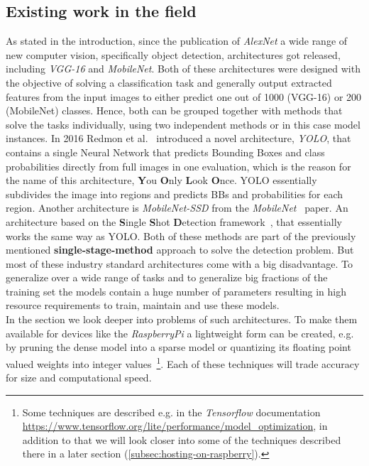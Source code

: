 \subsection{Existing work in the field}\label{subsec:existing-work-in-the-field}
As stated in the introduction, since the publication of \textit{AlexNet} a wide range of new computer vision, specifically object detection, architectures got released, including \textit{VGG-16} and \textit{MobileNet}.
Both of these architectures were designed with the objective of solving a classification task and generally output extracted features from the input images to either predict one out of 1000 (VGG-16) or 200 (MobileNet) classes.
Hence, both can be grouped together with methods that solve the tasks individually, using two independent methods or in this case model instances.
In 2016 Redmon et al.~\cite{yolo} introduced a novel architecture, \textit{YOLO}, that contains a single Neural Network that predicts Bounding Boxes and class probabilities directly from full images in one evaluation, which is the reason for the name of this architecture, \textbf{Y}ou \textbf{O}nly \textbf{L}ook \textbf{O}nce.
YOLO essentially subdivides the image into regions and predicts BBs and probabilities for each region.
Another architecture is \textit{MobileNet-SSD} from the \textit{MobileNet}~\cite{MobileNet} paper. An architecture based on the \textbf{S}ingle \textbf{S}hot \textbf{D}etection framework~\cite{SSD}, that essentially works the same way as YOLO.
Both of these methods are part of the previously mentioned \textbf{single-stage-method} approach to solve the detection problem.
But most of these industry standard architectures come with a big disadvantage.
To generalize over a wide range of tasks and to generalize big fractions of the training set the models contain a huge number of parameters resulting in high resource requirements to train, maintain and use these models.\\
In the  section we look deeper into problems of such architectures.
To make them available for devices like the \textit{RaspberryPi} a lightweight form can be created, e.g. by pruning the dense model into a sparse model or quantizing its floating point valued weights into integer values~\footnote{Some techniques are described e.g. in the \textit{Tensorflow} documentation \leavevmode\url{https://www.tensorflow.org/lite/performance/model_optimization}, in addition to that we will look closer into some of the techniques described there in a later section (\leavevmode\ref{subsec:hosting-on-raspberry}).}.
Each of these techniques will trade accuracy for size and computational speed.


